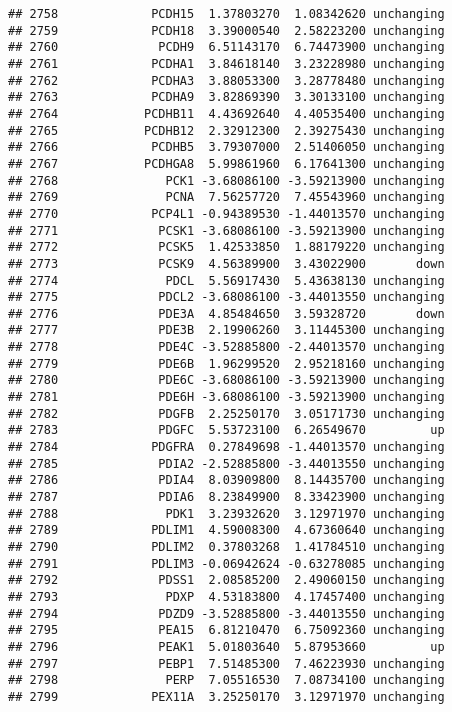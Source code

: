 \documentclass[]{article}
\begin{document}
\begin{verbatim}
## 2758             PCDH15  1.37803270  1.08342620 unchanging
## 2759             PCDH18  3.39000540  2.58223200 unchanging
## 2760              PCDH9  6.51143170  6.74473900 unchanging
## 2761             PCDHA1  3.84618140  3.23228980 unchanging
## 2762             PCDHA3  3.88053300  3.28778480 unchanging
## 2763             PCDHA9  3.82869390  3.30133100 unchanging
## 2764            PCDHB11  4.43692640  4.40535400 unchanging
## 2765            PCDHB12  2.32912300  2.39275430 unchanging
## 2766             PCDHB5  3.79307000  2.51406050 unchanging
## 2767            PCDHGA8  5.99861960  6.17641300 unchanging
## 2768               PCK1 -3.68086100 -3.59213900 unchanging
## 2769               PCNA  7.56257720  7.45543960 unchanging
## 2770             PCP4L1 -0.94389530 -1.44013570 unchanging
## 2771              PCSK1 -3.68086100 -3.59213900 unchanging
## 2772              PCSK5  1.42533850  1.88179220 unchanging
## 2773              PCSK9  4.56389900  3.43022900       down
## 2774               PDCL  5.56917430  5.43638130 unchanging
## 2775              PDCL2 -3.68086100 -3.44013550 unchanging
## 2776              PDE3A  4.85484650  3.59328720       down
## 2777              PDE3B  2.19906260  3.11445300 unchanging
## 2778              PDE4C -3.52885800 -2.44013570 unchanging
## 2779              PDE6B  1.96299520  2.95218160 unchanging
## 2780              PDE6C -3.68086100 -3.59213900 unchanging
## 2781              PDE6H -3.68086100 -3.59213900 unchanging
## 2782              PDGFB  2.25250170  3.05171730 unchanging
## 2783              PDGFC  5.53723100  6.26549670         up
## 2784             PDGFRA  0.27849698 -1.44013570 unchanging
## 2785              PDIA2 -2.52885800 -3.44013550 unchanging
## 2786              PDIA4  8.03909800  8.14435700 unchanging
## 2787              PDIA6  8.23849900  8.33423900 unchanging
## 2788               PDK1  3.23932620  3.12971970 unchanging
## 2789             PDLIM1  4.59008300  4.67360640 unchanging
## 2790             PDLIM2  0.37803268  1.41784510 unchanging
## 2791             PDLIM3 -0.06942624 -0.63278085 unchanging
## 2792              PDSS1  2.08585200  2.49060150 unchanging
## 2793               PDXP  4.53183800  4.17457400 unchanging
## 2794              PDZD9 -3.52885800 -3.44013550 unchanging
## 2795              PEA15  6.81210470  6.75092360 unchanging
## 2796              PEAK1  5.01803640  5.87953660         up
## 2797              PEBP1  7.51485300  7.46223930 unchanging
## 2798               PERP  7.05516530  7.08734100 unchanging
## 2799             PEX11A  3.25250170  3.12971970 unchanging

\end{verbatim}
\end{document}
